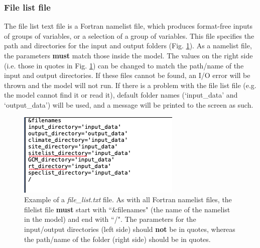 \documentclass[a4paper, 12pt] {article}
\begin{document}
\subsubsection{File list file}
The file list text file is a Fortran namelist file, which produces format-free inputs of groups of variables, or a selection of a group of variables. This file specifies the path and directories for the input and output folders (Fig. \ref{fig:filelist}). As a namelist file, the parameters \textbf{must} match those inside the model. The values on the right side (i.e. those in quotes in Fig. \ref{fig:filelist}) can be changed to match the path/name of the input and output directories. If these files cannot be found, an I/O error will be thrown and the model will not run. If there is a problem with the file list file (e.g. the model cannot find it or read it), default folder names (`input\_data' and `output\_data') will be used, and a message will be printed to the screen as such.

\begin{figure}[H]
  \includegraphics[width=0.6\linewidth]{manual_figures/filelist.png}
  \caption{Example of a \textit{file\_list.txt} file. As with all Fortran namelist files, the filelist file \textbf{must} start with ``\&filenames" (the name of the namelist in the model) and end with ``/". The parameters for the input/output directories (left side) should \textbf{not} be in quotes, whereas the path/name of the folder (right side) should be in quotes.}
  \label{fig:filelist}
\end{figure}
\end{document}
